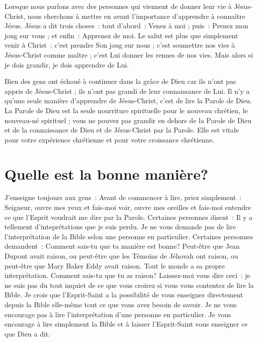 Lorsque nous parlons avec des personnes qui viennent de donner leur vie
 à Jésus-Christ, nous cherchons à mettre en avant l'importance d'apprendre
 à connaître Jésus. Jésus a dit trois choses~: tout d'abord~:
 \og Venez à moi \fg{} ; puis~: \og Prenez mon joug sur vous \fg{} ;
 et enfin~: \og Apprenez de moi. \fg{}
 Le salut est plus que simplement venir à Christ~: c'est prendre Son joug
 sur nous ; c'est soumettre nos vies à Jésus-Christ comme maître ;
 c'est Lui donner les rennes de nos vies.
 Mais alors si je dois grandir, je dois apprendre de Lui.

Bien des gens ont échoué à continuer dans la grâce de Dieu
 car ils n'ont pas appris de Jésus-Christ ; ils n'ont pas grandi
 de leur connaissance de Lui.
 Il n'y a qu'une seule manière d'apprendre de Jésus-Christ,
 c'est de lire la Parole de Dieu.
 La Parole de Dieu est la seule nourriture spirituelle pour le nouveau
 chrétien, le nouveau-né spirituel ; vous ne pouvez pas grandir en dehors
 de la Parole de Dieu et de la connaissance de Dieu et de Jésus-Christ
 par la Parole.
 Elle est vitale pour votre expérience chrétienne et pour votre croissance
 chrétienne.


\section*{Quelle est la bonne manière?}

J'enseigne toujours aux gens~:
 \og Avant de commencer à lire, priez simplement~:
 \og Seigneur, ouvre mes yeux et fais-moi voir,
 ouvre mes oreilles et fais-moi entendre ce que l'Esprit
 voudrait me dire par la Parole. \fg{}
 Certaines personnes disent~:
 \og Il y a tellement d'inteprétations que je suis perdu. \fg{}
 Je ne vous demande pas de lire l'interprétation de la Bible
 selon une personne en particulier.
 Certaines personnes demandent~:
 \og Comment sais-tu que ta manière est bonne? Peut-être que Jean Dupont
 avait raison, ou peut-être que les Témoins de Jéhovah ont raison,
 ou peut-être que Mary Baker Eddy avait raison.
 Tout le monde a sa propre interprétation.
 Comment sais-tu que tu as raison? \fg{}
 Laissez-moi vous dire ceci~: je ne suis pas du tout inquiet
 de ce que vous croirez si vous vous contentez de lire la Bible.
 Je crois que l'Esprit-Saint a la possibilité de vous enseigner
 \ocadr directement depuis la Bible elle-même \fcadr{}
 tout ce que vous avez besoin de savoir.
 Je ne vous encourage pas à lire l'interprétation d'une personne
 en particulier. Je vous encourage à lire simplement la Bible
 et à laisser l'Esprit-Saint vous enseigner ce que Dieu a dit.

